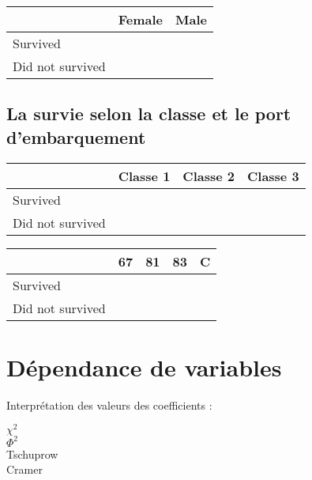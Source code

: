 \documentclass{article}
\begin{document}
\begin{table}[h!]  %
    \centering
    \begin{tabular}{l|c|c}
         & Female & Male\\ \hline
        Survived & & \\
        Did not survived & & \\
    \end{tabular}
\end{table}




\subsection{La survie selon la classe et le port d'embarquement}

\begin{table}[h!]  %
    \centering
    \begin{tabular}{l|c|c|c}
        & Classe 1 & Classe 2 & Classe 3\\ \hline
        Survived & & & \\
        Did not survived & & & \\
    \end{tabular}
\end{table}

\begin{table}[h!]  %
    \centering
    \begin{tabular}{l|c|c|c|c}
        & 67 & 81 & 83 & C\\ \hline
        Survived & & & & \\
        Did not survived & & & & \\
    \end{tabular}
\end{table}


\newpage
\section{Dépendance de variables}

Interprétation des valeurs des coefficients :
\begin{description}
    \item[$\chi^{2}$] 
    \item[$\Phi^{2}$] 
    \item[Tschuprow] 
    \item[Cramer] 
\end{description}
\end{document}
